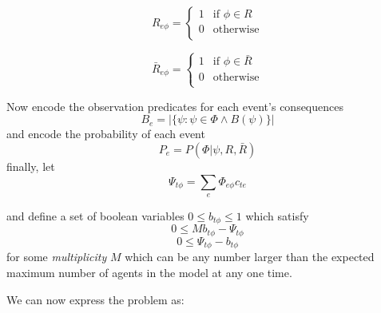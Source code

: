 \documentclass{article}
\begin{document}
\begin{equation}
R_{e\phi} =
\begin{cases}
1&\text{if } \phi \in R\\
0&\text{otherwise}\\
\end{cases}
\end{equation}

\begin{equation}
\bar{R}_{e\phi} =
\begin{cases}
1&\text{if } \phi \in \bar{R}\\
0&\text{otherwise}\\
\end{cases}
\end{equation}

Now encode the observation predicates for each event's consequences
\begin{equation}
B_e = |\{\psi: \psi\in\Phi \wedge B(\psi)\}|
\end{equation}
and encode the probability of each event
\[
P_e = P(\Phi|\psi,R,\bar{R})
\]
finally, let
\begin{equation}
\Psi_{t\phi} = \sum_e\Phi_{e\phi}c_{te}
\label{stateIndicator}
\end{equation}

and define a set of boolean variables $0 \le b_{t\phi} \le 1$ which satisfy
\begin{equation}
0 \le Mb_{t\phi} - \Psi_{t\phi}
\label{bGEconstraint}
\end{equation}
\begin{equation}
0 \le \Psi_{t\phi} - b_{t\phi} 
\label{bLEconstraint}
\end{equation}
for some \textit{multiplicity} $M$ which can be any number larger than the expected maximum number of agents in the model at any one time.

We can now express the problem as:
\end{document}
